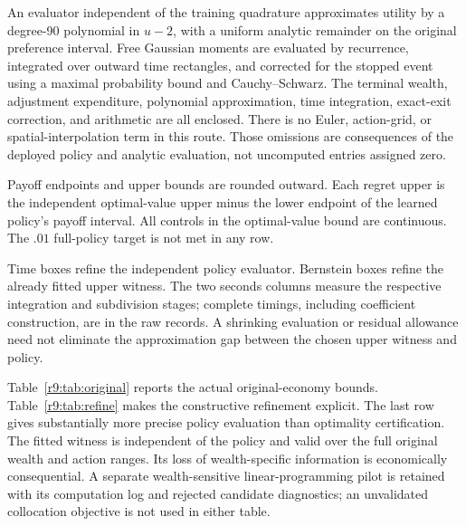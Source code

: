 An evaluator independent of the training quadrature approximates utility by a degree-90 polynomial in $u-2$, with a uniform analytic remainder on the original preference interval. Free Gaussian moments are evaluated by recurrence, integrated over outward time rectangles, and corrected for the stopped event using a maximal probability bound and Cauchy--Schwarz. The terminal wealth, adjustment expenditure, polynomial approximation, time integration, exact-exit correction, and arithmetic are all enclosed. There is no Euler, action-grid, or spatial-interpolation term in this route. Those omissions are consequences of the deployed policy and analytic evaluation, not uncomputed entries assigned zero.

\begin{table}[t]
\centering\small
\caption{Original-payoff continuous certificates at the central state}\label{r9:tab:original}

\par\smallskip\footnotesize Payoff endpoints and upper bounds are rounded outward. Each regret upper is the independent optimal-value upper minus the lower endpoint of the learned policy's payoff interval. All controls in the optimal-value bound are continuous. The $.01$ full-policy target is not met in any row.
\end{table}

\begin{table}[t]
\centering\scriptsize
\caption{Executed refinement for the $k=2$ certificate}\label{r9:tab:refine}

\par\smallskip\footnotesize Time boxes refine the independent policy evaluator. Bernstein boxes refine the already fitted upper witness. The two seconds columns measure the respective integration and subdivision stages; complete timings, including coefficient construction, are in the raw records. A shrinking evaluation or residual allowance need not eliminate the approximation gap between the chosen upper witness and policy.
\end{table}

Table~\ref{r9:tab:original} reports the actual original-economy bounds. Table~\ref{r9:tab:refine} makes the constructive refinement explicit. The last row gives substantially more precise policy evaluation than optimality certification. The fitted witness is independent of the policy and valid over the full original wealth and action ranges. Its loss of wealth-specific information is economically consequential. A separate wealth-sensitive linear-programming pilot is retained with its computation log and rejected candidate diagnostics; an unvalidated collocation objective is not used in either table.

